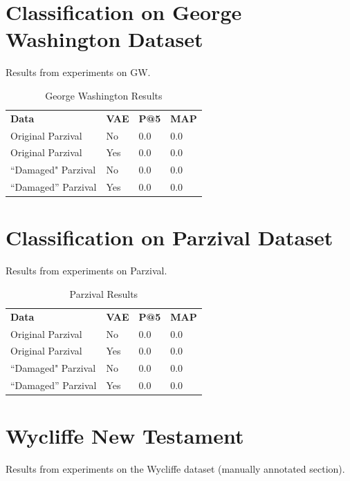 \documentclass[final]{ukthesis}
\begin{document}
%
%
\section{Classification on George Washington Dataset}
Results from experiments on GW.
\begin{table}[]
\centering
\caption{George Washington Results}
\label{my-label}
\begin{tabular}{llll}
\textbf{Data }  & \textbf{VAE  } & \textbf{P@5  } & \textbf{MAP } \\
Original Parzival    & No                 & 0.0 & 0.0 \\
Original Parzival    & Yes                & 0.0 & 0.0 \\
``Damaged" Parzival  & No                 & 0.0 & 0.0 \\
``Damaged'' Parzival & Yes                & 0.0 & 0.0
\end{tabular}
\end{table}




%
%
\section{Classification on Parzival Dataset}
Results from experiments on Parzival.


\begin{table}[h]
\centering
\caption{Parzival Results}
\label{my-label}
\begin{tabular}{llll}
\textbf{Data }  & \textbf{VAE  } & \textbf{P@5  } & \textbf{MAP  } \\
Original Parzival    & No                 & 0.0 & 0.0 \\
Original Parzival    & Yes                & 0.0 & 0.0 \\
``Damaged" Parzival  & No                 & 0.0 & 0.0 \\
``Damaged'' Parzival & Yes                & 0.0 & 0.0
\end{tabular}
\end{table}




%
%
\section{Wycliffe New Testament}
Results from experiments on the Wycliffe dataset (manually annotated section).
\end{document}
